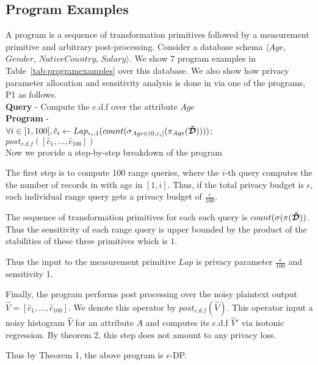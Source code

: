 \subsection{Program Examples}
A \system program is a sequence of transformation primitives followed by a measurement primitive and arbitrary post-processing. Consider a database schema $\langle Age$, $Gender$, $NativeCountry$, $Salary\rangle$. We show 7 \system program examples in Table~\ref{tab:programexamples} over this database.
We also show how privacy parameter allocation and sensitivity analysis is done in \system via one of the programs, P1 as follows. \\
\textbf{Query} - Compute the c.d.f over the attribute $Age$\\
\textbf{\system Program }- \\
$\forall i\in [1,100],\hat{c}_i \leftarrow Lap_{\epsilon_i,1}(count(\sigma_{Age \in (0, c_i]}(\pi_{Age}(\boldsymbol{\tilde{\mathcal{D}}}))))$;\\ $post_{c.d.f}([\hat{c}_1,\ldots,\hat{c}_{100}])$\\
Now we provide a step-by-step breakdown of the program
\squishlistnum \item The first step is to compute 100 range queries, where the $i$-th query computes the the number of records in with age in $[1,i]$. Thus, if the total privacy budget is $\epsilon$, each individual range query gets a privacy budget of $\frac{\epsilon}{100}$. 
\item  The sequence of transformation primitives for each such query is $count(\sigma(\pi(\boldsymbol{\tilde{\mathcal{D}}}))$. Thus the sensitivity of each range query is upper bounded by the product of the stabilities of these three primitives which is $1$. \item Thus the input to the measurement primitive $Lap$ is privacy parameter $\frac{\epsilon}{100}$ and sensitivity 1. \item Finally, the program performs post processing over the noisy plaintext output $\hat{V}=[\hat{c}_1,...,\hat{c}_{100}]$. We denote this operator by $post_{c.d.f}(\hat{V})$. This operator input a noisy histogram $\hat{V}$
for an attribute $A$ and computes its c.d.f $\hat{V}'$ via isotonic regression. By theorem 2, this step does not amount to any privacy loss.\item Thus by Theorem 1, the above program is $\epsilon$-DP. \squishendnum 
